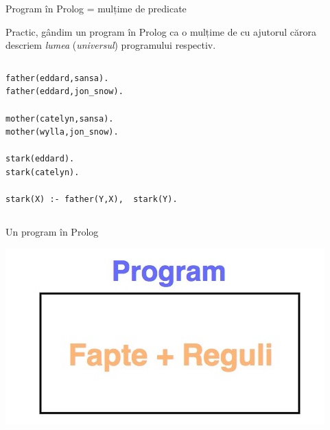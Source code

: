 \documentclass[xcolor=x11names,compress,10pt]{beamer}
\begin{document}

\begin{frame}[fragile]{Program în Prolog = mulțime de predicate}

Practic, gândim un program în Prolog ca o mulțime de   cu ajutorul cărora descriem {\it lumea} ({\it universul}) programului respectiv.
 
\begin{example}
\begin{columns}
\begin{column}{.5\textwidth}
\begin{verbatim}
father(eddard,sansa). 
father(eddard,jon_snow).

mother(catelyn,sansa). 
mother(wylla,jon_snow).

stark(eddard).
stark(catelyn).

stark(X) :- father(Y,X),  stark(Y).
\end{verbatim}
\end{column}
\begin{column}{.3\textwidth}
\\
\\
\\
\end{column}
\end{columns}
\smallskip
\end{example}



\end{frame}


\begin{frame}{Un program în Prolog}

\begin{center}

\includegraphics[scale=.3]{img/Prolog1}


\end{center}


\end{frame}
\end{document}
